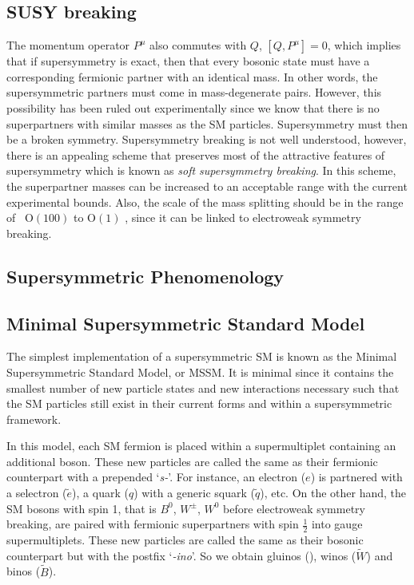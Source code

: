 \subsection*{SUSY breaking} 

The momentum operator $P^{\mu}$ also commutes with $Q$, $\left[Q,P^\mu\right]=0$, which implies that if 
supersymmetry is exact, then that every bosonic state must have a corresponding fermionic partner with 
an identical mass. In other words, the supersymmetric partners must come in mass-degenerate pairs.
However, this possibility has been ruled out experimentally since we know that there is no superpartners 
with similar masses as the SM particles. Supersymmetry must then be a broken symmetry. 
Supersymmetry breaking is not well understood, however, there is an appealing scheme that preserves 
most of the attractive features of supersymmetry which is known as \textit{soft supersymmetry breaking}.
In this scheme, the superpartner masses can be increased to an acceptable range with the current 
experimental bounds. Also, the scale of the mass splitting should be in the range of 
~$\mathrm{O}\left(100\right)$ \GeV to $\mathrm{O}\left(1\right)$ \TeV, since it can be linked to electroweak 
symmetry breaking\cite{Chung:2003fi}. 

\subsection{Supersymmetric Phenomenology}

\subsection*{Minimal Supersymmetric Standard Model} 

The simplest implementation of a supersymmetric SM is known as the Minimal Supersymmetric Standard Model, or 
MSSM. It is minimal since it contains the smallest number of new particle states and new interactions 
necessary such that the SM particles still exist in their current forms and within a supersymmetric framework.

In this model, each SM fermion is placed within a supermultiplet containing an additional boson. 
These new particles are called the same as their fermionic counterpart with a prepended `\textit{s-}'.
For instance, an electron ($e$) is partnered with a selectron ($\tilde{e}$), a quark ($q$) with a generic 
squark ($\tilde{q}$), etc. On the other hand, the SM bosons with spin 1, that is $B^0$, $W^{\pm}$, $W^0$ before 
electroweak symmetry breaking, are paired with fermionic superpartners with spin $\frac{1}{2}$ into gauge 
supermultiplets. These new particles are called the same as their bosonic counterpart but with the postfix 
`\textit{-ino}'. So we obtain gluinos (\gluino), winos ($\tilde{W}$) and binos ($\tilde{B}$).

